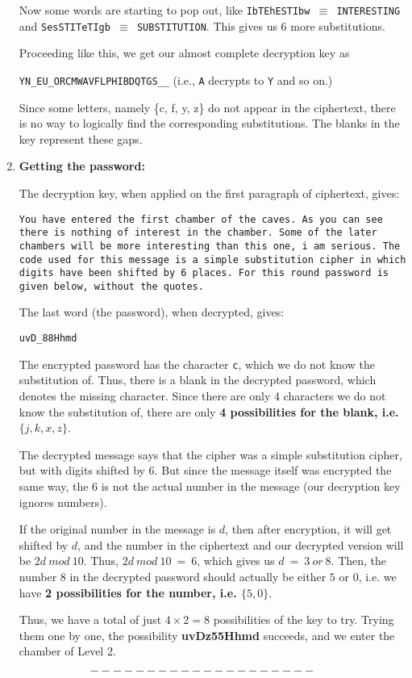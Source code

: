 \documentclass[11pt]{article}
\begin{document}
\begin{enumerate}
  Now some words are starting to pop out, like \texttt{IbTEhESTIbw $\equiv$ INTERESTING} and \texttt{SesSTITeTIgb $\equiv$ SUBSTITUTION}. This gives us 6 more substitutions.
  
  Proceeding like this, we get our almost complete decryption key as 

  \texttt{YN\_EU\_ORCMWAVFLPHIBDQTGS\_\_} \quad\quad (i.e., \texttt{A} decrypts to \texttt{Y} and so on.)

  Since some letters, namely \{c, f, y, z\} do not appear in the ciphertext, there is no way to logically find the corresponding substitutions. The blanks in the key represent these gaps.

  \pagebreak

  \item \textbf{Getting the password: }
  
  The decryption key, when applied on the first paragraph of ciphertext, gives: 

  \texttt{You have entered the first chamber of the caves. As you can see there is nothing of interest in the chamber. Some of the later chambers will be more interesting than this one, i am serious. The code used for this message is a simple substitution cipher in which digits have been shifted by 6 places. For this round password is given below, without the quotes.}

  The last word (the password), when decrypted, gives: 

  \texttt{uvD\_88Hhmd}

  The encrypted password has the character \texttt{c}, which we do not know the substitution of. Thus, there is a blank in the decrypted password, which denotes the missing character. Since there are only 4 characters we do not know the substitution of, there are only \textbf{4 possibilities for the blank, i.e. $\{j, k, x, z\}$}.

  The decrypted message says that the cipher was a simple substitution cipher, but with digits shifted by 6. But since the message itself was encrypted the same way, the 6 is not the actual number in the message (our decryption key ignores numbers).

  If the original number in the message is $d$, then after encryption, it will get shifted by $d$, and the number in the ciphertext and our decrypted version will be $2d\ mod\ 10$. Thus, $2d\ mod\ 10\ =\ 6$, which gives us $d\ =\ 3\ or\ 8$. Then, the number 8 in the decrypted password should actually be either $5$ or $0$, i.e. we have \textbf{2 possibilities for the number, i.e. $\{5, 0\}$}.
  
  Thus, we have a total of just $4 \times 2 = 8$ possibilities of the key to try. Trying them one by one, the possibility \textbf{uvDz55Hhmd} succeeds, and we enter the chamber of Level 2.
  
\end{enumerate}

$$--------------------$$
\end{document}
